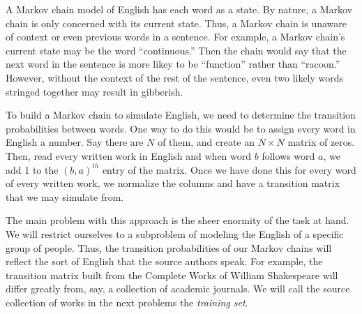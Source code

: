 A Markov chain model of English has each word as a state.
By nature, a Markov chain is only concerned with its current state.
Thus, a Markov chain is unaware of context or even previous words in a sentence.
For example, a Markov chain's current state may be the word ``continuous.''
Then the chain would say that the next word in the sentence is more likey to be ``function'' rather than ``racoon.''
However, without the context of the rest of the sentence, even two likely words stringed together may result in gibberish.

To build a Markov chain to simulate English, we need to determine the transition probabilities between words.
One way to do this would be to assign every word in English a number.  Say there are $N$ of them, and create an $N\times N$ matrix of zeros.
Then, read every written work in English and when word $b$ follows word $a$, we add 1 to the $(b,a)^{th}$ entry of the matrix.
Once we have done this for every word of every written work, we normalize the columns and have a transition matrix that we may simulate from.

The main problem with this approach is the sheer enormity of the task at hand.
We will restrict ourselves to a subproblem of modeling the English of a specific group of people.
Thus, the transition probabilities of our Markov chains will reflect the sort of English that the source authors speak.
For example, the transition matrix built from the Complete Works of William Shakespeare will differ greatly from, say, a collection of academic journals.
We will call the source collection of works in the next problems the \emph{training set}.

